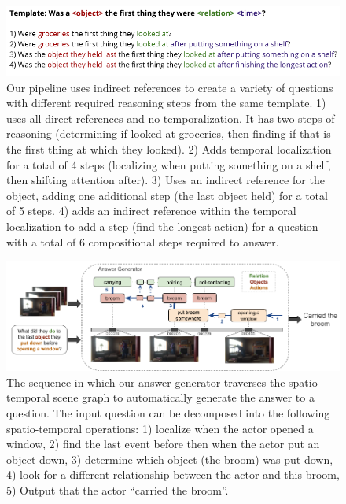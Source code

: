 \begin{figure}[t]
\begin{center}
\includegraphics[width=0.8\linewidth]{Figures/figure_indirect.png}
\end{center}
   \caption{Our pipeline uses indirect references to create a variety of questions with different required reasoning steps from the same template. 1) uses all direct references and no temporalization. It has two steps of reasoning (determining if looked at groceries, then finding if that is the first thing at which they looked). 2) Adds temporal localization for a total of 4 steps (localizing when putting something on a shelf, then shifting attention after). 3) Uses an indirect reference for the object, adding one additional step (the last object held) for a total of 5 steps. 4) adds an indirect reference within the temporal localization to add a step (find the longest action) for a question with a total of 6 compositional steps required to answer.}
\label{template_expansion}
\end{figure}

\begin{figure}[t]
\begin{center}
\includegraphics[width=0.8\linewidth]{Figures/figure_questionGenerator.png}
\end{center}
   \caption{The sequence in which our answer generator traverses the spatio-temporal scene graph to automatically generate the answer to a question. The input question can be decomposed into the following spatio-temporal operations: 
  1) localize when the actor opened a window, 
  2) find the last event before then when the actor put an object down, 
  3) determine which object (the broom) was put down, 
  4) look for a different relationship between the actor and this broom, 
  5) Output that the actor ``carried the broom''.}
\label{answer_generator}
\end{figure}

